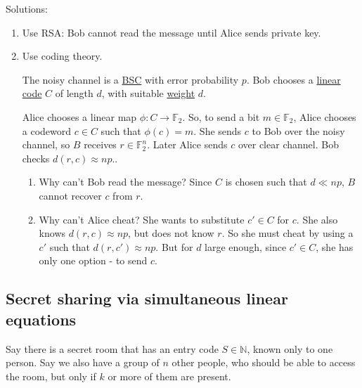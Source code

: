 \documentclass{article}
\newcommand{\F}{\mathbb{F}}
\newcommand{\1}[1]{\mathbbm{1}_{#1}}
\begin{document}
Solutions:
\begin{enumerate}[label=\roman*)]
    \item Use RSA: Bob cannot read the message until Alice sends private key.
    \item Use coding theory.
    \begin{center}
    \end{center}
    The noisy channel is a \hyperlink{def:bsc}{BSC} with error probability $p$.
    Bob chooses a \hyperlink{def:linearCode}{linear code} $C$ of length $d$, with suitable \hyperlink{def:weight}{weight} $d$.

    Alice chooses a linear map $\phi: C \to \F_2$.
    So, to send a bit $m \in \F_2$, Alice chooses a codeword $c \in C$ such that $\phi(c) = m$.
    She sends $c$ to Bob over the noisy channel, so $B$ receives $r \in \F_2^n$.
    Later Alice sends $c$ over clear channel.
    Bob checks $d(r, c) \approx n p.$.

    \begin{enumerate}[label=\arabic*)]
        \item Why can't Bob read the message? Since $C$ is chosen such that $d \ll np$, $B$ cannot recover $c$ from $r$.
        \item Why can't Alice cheat? She wants to substitute $c' \in C$ for $c$.
            She also knows $d(r,c) \approx np$, but does not know $r$.
            So she must cheat by using a $c'$ such that $d(r, c') \approx np$.
            But for $d$ large enough, since $c' \in C$, she has only one option - to send $c$.
    \end{enumerate}
\end{enumerate}

\subsection{Secret sharing via simultaneous linear equations}
Say there is a secret room that has an entry code $S \in \mathbb{N}$, known only to one person.
Say we also have a group of $n$ other people, who should be able to access the room, but only if $k$ or more of them are present.
\end{document}

